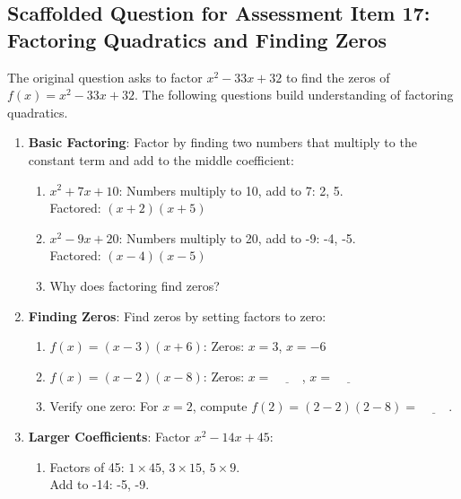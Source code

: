 \documentclass[12pt]{article}
\begin{document}
\subsection*{Scaffolded Question for Assessment Item 17: Factoring Quadratics and Finding Zeros}
The original question asks to factor \( x^2 - 33x + 32 \) to find the zeros of \( f(x) = x^2 - 33x + 32 \). The following questions build understanding of factoring quadratics.

\begin{enumerate}[label=17.\arabic*]
    \item \textbf{Basic Factoring}: Factor by finding two numbers that multiply to the constant term and add to the middle coefficient:
    \begin{enumerate}[label=\alph*)]
        \item \( x^2 + 7x + 10 \): Numbers multiply to 10, add to 7: 2, 5. \\
        Factored: \( (x + 2)(x + 5) \)
        \item \( x^2 - 9x + 20 \): Numbers multiply to 20, add to -9: -4, -5. \\
        Factored: \( (x - 4)(x - 5) \)
        \item Why does factoring find zeros? \underline{\hspace{6cm}}
    \end{enumerate}
    \item \textbf{Finding Zeros}: Find zeros by setting factors to zero:
    \begin{enumerate}[label=\alph*)]
        \item \( f(x) = (x - 3)(x + 6) \): Zeros: \( x = 3 \), \( x = -6 \)
        \item \( f(x) = (x - 2)(x - 8) \): Zeros: \( x = \underline{\hspace{1cm}} \), \( x = \underline{\hspace{1cm}} \)
        \item Verify one zero: For \( x = 2 \), compute \( f(2) = (2 - 2)(2 - 8) = \underline{\hspace{1cm}} \).
    \end{enumerate}
    \item \textbf{Larger Coefficients}: Factor \( x^2 - 14x + 45 \):
    \begin{enumerate}[label=\alph*)]
        \item Factors of 45: \( 1 \times 45 \), \( 3 \times 15 \), \( 5 \times 9 \). \\
        Add to -14: -5, -9. \\

\end{enumerate}
\end{enumerate}
\end{document}
